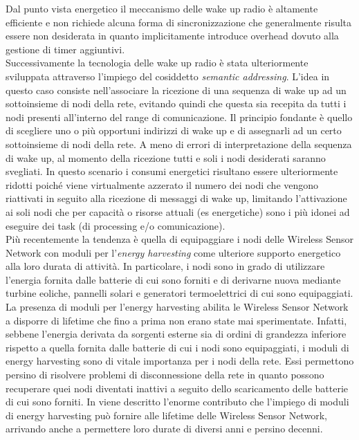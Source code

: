 \documentclass[binding=0.6cm,TFA]{sapthesis}
\begin{document}
Dal punto vista energetico il meccanismo delle wake up radio è altamente efficiente e non richiede alcuna forma di sincronizzazione che generalmente
risulta essere  non desiderata in quanto implicitamente introduce overhead dovuto alla gestione di timer aggiuntivi.\\

Successivamente la tecnologia delle wake up radio è stata ulteriormente sviluppata attraverso l'impiego del cosiddetto \emph{semantic addressing}.
L'idea in questo caso consiste nell'associare la ricezione di una sequenza di wake up ad un sottoinsieme di nodi della rete, evitando quindi che questa sia
recepita da tutti i nodi presenti all'interno del range di comunicazione. Il principio fondante è quello di scegliere uno o più opportuni indirizzi di
wake up e di assegnarli ad un certo sottoinsieme di nodi della rete. A meno di errori di interpretazione della sequenza di wake up, al momento della
ricezione tutti e soli i nodi desiderati saranno svegliati. In questo scenario i consumi energetici risultano essere ulteriormente ridotti poiché viene
virtualmente azzerato il numero dei nodi che vengono riattivati in seguito alla ricezione di messaggi di wake up, limitando l'attivazione ai soli nodi che
per capacità o risorse attuali (es energetiche) sono i più idonei ad  eseguire dei task (di processing e/o comunicazione).\\

Più recentemente la tendenza è quella di equipaggiare i nodi delle Wireless Sensor Network con moduli per l'\emph{energy harvesting} come ulteriore
supporto energetico alla loro durata di attività. In particolare, i nodi sono in grado di utilizzare l'energia fornita dalle batterie di cui sono
forniti e di derivarne nuova mediante turbine eoliche, pannelli solari e generatori termoelettrici di cui sono equipaggiati.\\

\newpage
La presenza di moduli per l'energy harvesting abilita le Wireless Sensor Network a disporre di lifetime che fino a prima non erano state mai sperimentate.
Infatti, sebbene l'energia derivata da sorgenti esterne sia di ordini di grandezza inferiore rispetto a quella fornita dalle batterie di cui i nodi sono
equipaggiati, i moduli di energy harvesting sono di vitale importanza per i nodi della rete. Essi permettono persino di risolvere problemi di disconnessione
della rete in quanto possono recuperare quei nodi diventati inattivi a seguito dello scaricamento delle batterie di cui sono forniti. In
\cite{wsn-energy-harvesting-paper} viene descritto l'enorme contributo che l'impiego di moduli di energy harvesting può fornire alle lifetime delle
Wireless Sensor Network, arrivando anche a permettere loro durate di diversi anni e persino decenni.\\
\end{document}
